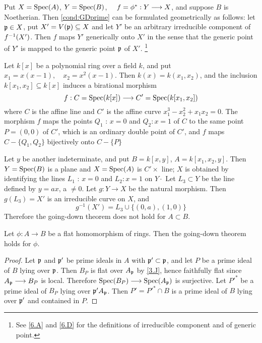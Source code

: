 \documentclass[../main]{subfiles}
\begin{document}
\begin{remark} Put $X=\operatorname{Spec}(A)$, $Y=\operatorname{Spec}(B)$, $\quad f=\phi^\ast: Y \longrightarrow X$, and suppose $B$ is Noetherian. Then \ref{cond:GDprime} can be formulated geometrically as follows: let $\mathfrak{p} \in X$, put $X'=V(\mathfrak{p}) \subseteq X$ and let $Y'$ be an arbitrary irreducible component of $f^{-1}(X')$. Then $f$ maps $Y'$ generically onto $X'$ in the sense that the generic point of $Y'$ is mapped to the generic point $\mathfrak{p}$ of $X'$. \footnote{See \ref{6.A} and \ref{6.D} for the definitions of irreducible component and of generic point.}
\end{remark}

\begin{parexample}
Let $k[x]$ be a polynomial ring over a field $k$, and put $x_1=x(x-1), \quad x_2=x^2(x-1)$. Then $k(x)=k(x_1, x_2)$, and the inclusion $k[x_1, x_2] \subseteq k[x]$ induces a birational morphism
\[f: C=\operatorname{Spec}(k[x]) \longrightarrow C'=\operatorname{Spec}(k[x_1, x_2])\]
where $C$ is the affine line and $C'$ is the affine curve $x_1^3-x_2^2+x_1 x_2=0$. The morphism $f$ maps the points $Q_1$ : $x=0$ and $Q_2: x=1$ of $C$ to the same point $P=(0,0)$ of $C'$, which is an ordinary double point of $C'$, and $f$ maps $C-\{Q_1, Q_2\}$ bijectively onto $C-\{P\}$
\end{parexample}

Let $y$ be another indeterminate, and put $B=k[x, y]$, $A=k[x_1, x_2, y]$. Then $Y=\operatorname{Spec}(B)$ is a plane and $X=\operatorname{Spec}(A)$ is $C' \times$ line; $X$ is obtained by identifying the lines $L_1$ : $x=0$ and $L_2: x=1$ on $Y \cdot$ Let $L_3 \subset Y$ be the line defined by $y=a x$, a $\neq 0$. Let $g: Y \longrightarrow X$ be the natural morphism. Then $g(L_3)=X'$ is an irreducible curve on $X$, and
\[g^{-1}(X')=L_3 \cup\{(0, a),(1,0)\}\]
Therefore the going-down theorem does not hold for $A \subset B$.

\begin{partheorem}\label{thm:004}
Let $\phi: A \longrightarrow B$ be a flat homomorphism of rings. Then the going-down theorem holds for $\phi$.
\end{partheorem}

\begin{proof} 
Let $\mathfrak{p}$ and $\mathfrak{p}'$ be prime ideals in $A$ with $\mathfrak{p}' \subset \mathfrak{p}$, and let $P$ be a prime ideal of $B$ lying over $\mathfrak{p}$. Then $B_P$ is flat over $A_{\mathfrak{p}}$ by \ref{3.J}, hence faithfully flat since $A_{\mathfrak{p}} \longrightarrow B_P$ is local. Therefore $\operatorname{Spec}(B_P) \longrightarrow \operatorname{Spec}(A_{\mathfrak{p}})$ is surjective. Let $P'^*$ be a prime ideal of $B_P$ lying over $\mathfrak{p}'A_{\mathfrak{p}}$. Then $P'=P'^* \cap B$ is a prime ideal of $B$ lying over $\mathfrak{p}'$ and contained in $P$.
\end{proof}
\end{document}
